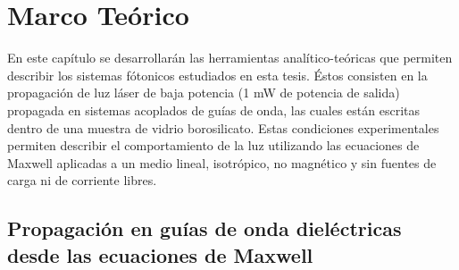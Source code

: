 \chapter{Marco Teórico}

En este capítulo se desarrollarán las herramientas analítico-teóricas que permiten describir los sistemas fótonicos estudiados en esta tesis. Éstos consisten en la propagación de luz láser de baja potencia (1 mW de potencia de salida) propagada en sistemas acoplados de guías de onda, las cuales están escritas dentro de una muestra de vidrio borosilicato. Estas condiciones experimentales permiten describir el comportamiento de la luz utilizando las ecuaciones de Maxwell aplicadas a un medio lineal, isotrópico, no magnético y sin fuentes de carga ni de corriente libres. 

\section{Propagación en guías de onda dieléctricas desde las ecuaciones de Maxwell \label{cap:maxwell}}

